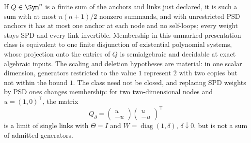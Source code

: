 If \(Q\in\Sym^n\) is a finite sum of the anchors and links just declared, it is
such a sum with at most \(n(n+1)/2\) nonzero summands, and with unrestricted PSD
anchors it has at most one anchor at each node and no self-loops; every weight
stays SPD and every link invertible. Membership in this unmarked presentation
class is equivalent to one finite disjunction of existential polynomial
systems, whose projection onto the entries of \(Q\) is semialgebraic and
decidable at exact algebraic inputs. The scaling and deletion hypotheses are
material: in one scalar dimension, generators restricted to the value \(1\)
represent \(2\) with two copies but not within the bound \(1\). The class need
not be closed, and replacing SPD weights by PSD ones changes membership: for two
two-dimensional nodes and \(u=(1,0)^\top\), the matrix
\begin{equation}
Q_\partial=\begin{pmatrix}u\\-u\end{pmatrix}
\begin{pmatrix}u\\-u\end{pmatrix}^{\top}
\label{eq:cg-finite-pair-strict-boundary}
\end{equation}
is a limit of single links with \(\Theta=I\) and
\(W=\operatorname{diag}(1,\delta)\), \(\delta\downarrow0\), but is not a sum of
admitted generators. 

